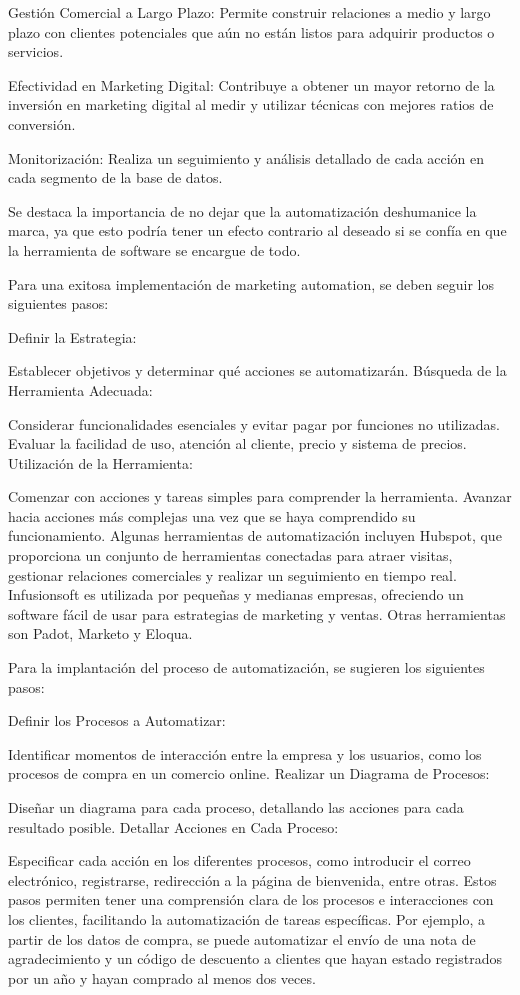 \documentclass[
    a4paper, %
    10pt, %
    unnumberedsections, %
    twoside, %
]{LTJournalArticle}
\begin{document}
Gestión Comercial a Largo Plazo: Permite construir relaciones a medio y largo plazo con clientes potenciales que aún no están listos para adquirir productos o servicios.

Efectividad en Marketing Digital: Contribuye a obtener un mayor retorno de la inversión en marketing digital al medir y utilizar técnicas con mejores ratios de conversión.

Monitorización: Realiza un seguimiento y análisis detallado de cada acción en cada segmento de la base de datos.

Se destaca la importancia de no dejar que la automatización deshumanice la marca, ya que esto podría tener un efecto contrario al deseado si se confía en que la herramienta de software se encargue de todo.


Para una exitosa implementación de marketing automation, se deben seguir los siguientes pasos:

Definir la Estrategia:

Establecer objetivos y determinar qué acciones se automatizarán.
Búsqueda de la Herramienta Adecuada:

Considerar funcionalidades esenciales y evitar pagar por funciones no utilizadas.
Evaluar la facilidad de uso, atención al cliente, precio y sistema de precios.
Utilización de la Herramienta:

Comenzar con acciones y tareas simples para comprender la herramienta.
Avanzar hacia acciones más complejas una vez que se haya comprendido su funcionamiento.
Algunas herramientas de automatización incluyen Hubspot, que proporciona un conjunto de herramientas conectadas para atraer visitas, gestionar relaciones comerciales y realizar un seguimiento en tiempo real. Infusionsoft es utilizada por pequeñas y medianas empresas, ofreciendo un software fácil de usar para estrategias de marketing y ventas. Otras herramientas son Padot, Marketo y Eloqua.

Para la implantación del proceso de automatización, se sugieren los siguientes pasos:

Definir los Procesos a Automatizar:

Identificar momentos de interacción entre la empresa y los usuarios, como los procesos de compra en un comercio online.
Realizar un Diagrama de Procesos:

Diseñar un diagrama para cada proceso, detallando las acciones para cada resultado posible.
Detallar Acciones en Cada Proceso:

Especificar cada acción en los diferentes procesos, como introducir el correo electrónico, registrarse, redirección a la página de bienvenida, entre otras.
Estos pasos permiten tener una comprensión clara de los procesos e interacciones con los clientes, facilitando la automatización de tareas específicas. Por ejemplo, a partir de los datos de compra, se puede automatizar el envío de una nota de agradecimiento y un código de descuento a clientes que hayan estado registrados por un año y hayan comprado al menos dos veces.
\end{document}
